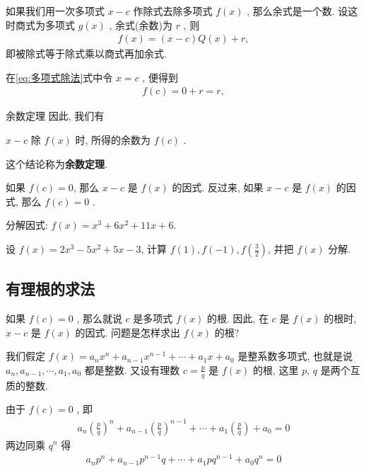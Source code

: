 \documentclass[aspectratio=169]{ctexbeamer}
\theoremstyle{definition}
\begin{document}
\begin{frame}
	如果我们用一次多项式 $x-c$ 作除式去除多项式 $f(x)$ , 那么余式是一个数. 设这时商式为多项式 $g(x)$ , 余式(余数)为 $r$ , 则
	\begin{align}\label{eq:多项式除法}
		f(x)=(x-c) Q(x)+r,
	\end{align}
	即被除式等于除式乘以商式再加余式.

	在\ref{eq:多项式除法}式中令 $x=c$ , 便得到
	\begin{align*}
		f(c)=0+r=r,
	\end{align*}
\end{frame}

\begin{frame}{余数定理}
	因此, 我们有
	\begin{center}
		$x-c$ 除 $f(x)$ 时, 所得的余数为 $f(c)$ .
	\end{center}
	这个结论称为\textbf{余数定理}.
	\begin{block}{}
		如果 $f(c)=0$, 那么 $x-c$ 是 $f(x)$ 的因式. 反过来, 如果 $x-c$ 是 $f(x)$ 的因式, 那么 $f(c)=0$ .
	\end{block}
\end{frame}

\begin{frame}[t]
	\begin{example}
		分解因式: $f(x)=x^{3}+6 x^{2}+11 x+6$.
	\end{example}
\end{frame}

\begin{frame}[t]
	\begin{example}
		设 $f(x)=2 x^{3}-5 x^{2}+5 x-3$, 计算 $f(1), f(-1), f\left(\frac{3}{2}\right)$, 并把 $f(x)$ 分解.
	\end{example}
\end{frame}

\subsection{有理根的求法}
\begin{frame}
	如果 $f(c)=0$ , 那么就说 $c$ 是多项式 $f(x)$ 的根. 因此, 在 $c$ 是 $f(x)$ 的根时,  $x-c$ 是 $f(x)$ 的因式. 问题是怎样求出 $f(x)$ 的根?

	我们假定 $f(x)=a_{n} x^{n}+a_{n-1} x^{n-1}+\cdots+a_{1} x+a_{0}$ 是整系数多项式, 也就是说 $a_{n}, a_{n-1}, \cdots, a_{1}, a_{0}$ 都是整数. 又设有理数 $c=\frac{p}{q}$ 是 $f(x)$ 的根, 这里 $p$, $q$ 是两个互质的整数.

	由于 $f(c)=0$ , 即
	\begin{align*}
		a_{n}\left(\frac{p}{q}\right)^{n}+a_{n-1}\left(\frac{p}{q}\right)^{n-1}+\cdots+a_{1}\left(\frac{p}{q}\right)+a_{0}=0
	\end{align*}
	两边同乘 $q^{n}$ 得
	\begin{align}\label{eq:有理根}
		a_{n} p^{n}+a_{n-1} p^{n-1} q+\cdots+a_{1} p q^{n-1}+a_{0} q^{n}=0
	\end{align}
\end{frame}
\end{document}
